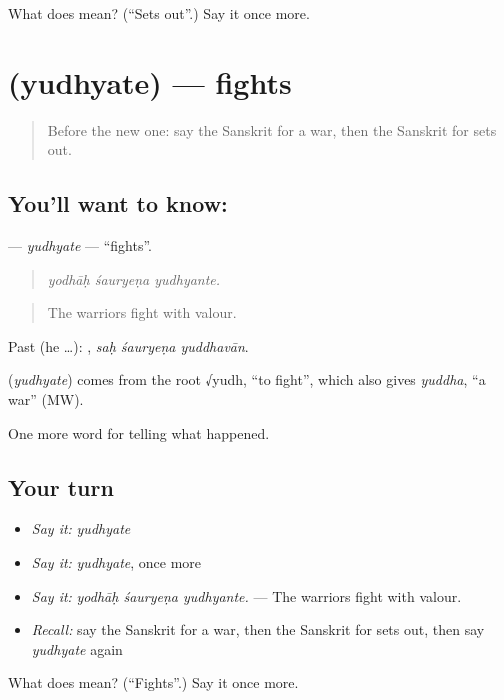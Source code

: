 \begin{tcolorbox}[breakable,colback=teal!4,colframe=teal!35!black,title={Before you move on}]
What does  mean? (\textquotedblleft{}Sets out\textquotedblright{}.) Say it once more.
\end{tcolorbox}
\section[\texorpdfstring{\sk{युध्यते} (yudhyate)}{युध्यते (yudhyate)}]{ (yudhyate) — fights}

\label{lesson:SA-C318-yudhyate}



\begin{quote}
Before the new one: say the Sanskrit for a war, then the Sanskrit for sets out.
\end{quote}

\subsection*{You'll want to know: }
\textbf{} — \emph{yudhyate} — \textquotedblleft{}fights\textquotedblright{}.

\begin{quote}
  
\end{quote}

\begin{quote}
\emph{yodhāḥ śauryeṇa yudhyante.}
\end{quote}

\begin{quote}
The warriors fight with valour.
\end{quote}

Past (he …):   , \emph{saḥ śauryeṇa yuddhavān}.

\begin{cousinweb}
\textbf{} (\emph{yudhyate}) comes from the root √yudh, \textquotedblleft{}to fight\textquotedblright{}, which also gives \emph{yuddha}, \textquotedblleft{}a war\textquotedblright{} (MW).
\end{cousinweb}

\begin{grammarlens}[title={What you've built}]
One more word for telling what happened.
\end{grammarlens}

\subsection*{Your turn}
\begin{itemize}
\raggedright
  \item \emph{Say it:} \emph{yudhyate}
  \item \emph{Say it:} \emph{yudhyate}, once more
  \item \emph{Say it:} \emph{yodhāḥ śauryeṇa yudhyante.} — The warriors fight with valour.
  \item \emph{Recall:} say the Sanskrit for a war, then the Sanskrit for sets out, then say \emph{yudhyate} again
\end{itemize}

\begin{tcolorbox}[breakable,colback=teal!4,colframe=teal!35!black,title={Before you move on}]
What does  mean? (\textquotedblleft{}Fights\textquotedblright{}.) Say it once more.
\end{tcolorbox}
